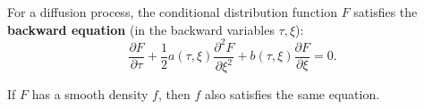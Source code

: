For a diffusion process, the conditional distribution function $F$ satisfies the \textbf{backward equation} (in the backward variables $\tau, \xi$):
$$\frac{\partial F}{\partial \tau} + \frac{1}{2} a(\tau, \xi) \frac{\partial^2 F}{\partial \xi^2} + b(\tau, \xi) \frac{\partial F}{\partial \xi} = 0.$$

If $F$ has a smooth density $f$, then $f$ also satisfies the same equation.
